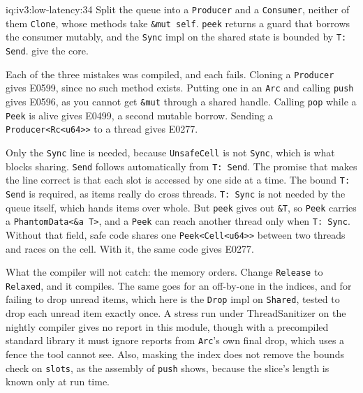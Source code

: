 \begin{solution}{iq:iv3:low-latency:34}
Split the queue into a \texttt{Producer} and a \texttt{Consumer}, neither of them \texttt{Clone}, whose methods take \texttt{\&mut self}. \texttt{peek} returns a guard that borrows the consumer mutably, and the \texttt{Sync} impl on the shared state is bounded by \texttt{T: Send}.  give the core.
\label{lst:iv3:ll:split}
\enlargethispage{-3\baselineskip}%
\label{lst:iv3:ll:peek}

Each of the three mistakes was compiled, and each fails. Cloning a \texttt{Producer} gives E0599, since no such method exists. Putting one in an \texttt{Arc} and calling \texttt{push} gives E0596, as you cannot get \texttt{\&mut} through a shared handle. Calling \texttt{pop} while a \texttt{Peek} is alive gives E0499, a second mutable borrow. Sending a \texttt{Producer<Rc<u64>{}>} to a thread gives E0277.

Only the \texttt{Sync} line is needed, because \texttt{UnsafeCell} is not \texttt{Sync}, which is what blocks sharing. \texttt{Send} follows automatically from \texttt{T: Send}. The promise that makes the line correct is that each slot is accessed by one side at a time. The bound \texttt{T: Send} is required, as items really do cross threads. \texttt{T: Sync} is not needed by the queue itself, which hands items over whole. But \texttt{peek} gives out \texttt{\&T}, so \texttt{Peek} carries a \texttt{PhantomData<\&\textquotesingle a T>}, and a \texttt{Peek} can reach another thread only when \texttt{T: Sync}. Without that field, safe code shares one \texttt{Peek<Cell<u64>{}>} between two threads and races on the cell. With it, the same code gives E0277.

What the compiler will not catch: the memory orders. Change \texttt{Release} to \texttt{Relaxed}, and it compiles. The same goes for an off-by-one in the indices, and for failing to drop unread items, which here is the \texttt{Drop} impl on \texttt{Shared}, tested to drop each unread item exactly once. A stress run under ThreadSanitizer on the nightly compiler gives no report in this module, though with a precompiled standard library it must ignore reports from \texttt{Arc}'s own final drop, which uses a fence the tool cannot see. Also, masking the index does not remove the bounds check on \texttt{slots}, as the assembly of \texttt{push} shows, because the slice's length is known only at run time.

\end{solution}

